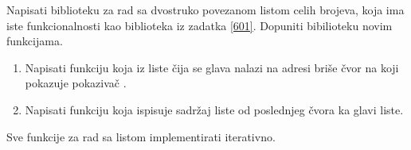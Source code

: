 \begin{Exercise}[label=603]
Napisati biblioteku za rad sa dvostruko povezanom listom celih brojeva, koja ima iste funkcionalnosti kao biblioteka iz zadatka \ref{601}. 
Dopuniti bibilioteku novim funkcijama.
\begin{enumerate}
 \item Napisati funkciju  koja iz liste čija se glava nalazi na adresi  briše čvor na koji pokazuje pokazivač .
 \item Napisati funkciju  koja ispisuje sadržaj liste od poslednjeg čvora ka glavi liste.
\end{enumerate}

Sve funkcije za rad sa listom implementirati iterativno.
\end{Exercise}
\begin{Answer}[ref=603]
\end{Answer}

